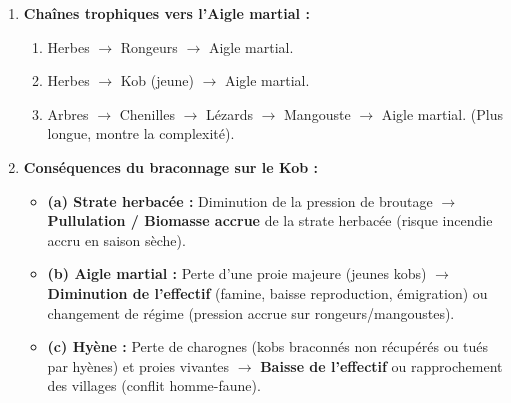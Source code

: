 \documentclass[11pt]{article}
\begin{document}
\begin{exoresolu}
\begin{enumerate}
\begin{center}
\begin{tabularx}{\linewidth}{|l|X|X|X|X|X|}
        \rowcolor{popgreenL} \textbf{Producteurs} & \textbf{Cons. 1\up{er} (Herbivores)} & \textbf{Cons. 2\up{nd} (Carniv. 1\up{er})} & \textbf{Cons. 3\up{me} (Carniv. 2\up{nd})} & \textbf{Cons. 4\up{me} (Superpréd.)} & \textbf{Décomposeurs} \\ \hline
        Herbes, Arbres, Arbustes & Sauterelles, Chenilles, Rongeurs, Kob, Phacochère & Lézards, Mangouste & Python, Aigle martial, Hyène, Chacal & (Aigle martial, Hyène -- sommet) & Bactéries, Champignons, Termites \\ \hline
        \end{tabularx}
        \end{center}
        \textit{Note :} L'Aigle martial et la Hyène peuvent occuper le niveau 3 ou 4 selon la proie (ex: manger un python = niveau 4). On les place au plus haut niveau atteint.
        \item \textbf{Chaînes trophiques vers l'Aigle martial :}
              \begin{enumerate}
                  \item Herbes $\rightarrow$ Rongeurs $\rightarrow$ Aigle martial.
                  \item Herbes $\rightarrow$ Kob (jeune) $\rightarrow$ Aigle martial.
                  \item Arbres $\rightarrow$ Chenilles $\rightarrow$ Lézards $\rightarrow$ Mangouste $\rightarrow$ Aigle martial. (Plus longue, montre la complexité).
              \end{enumerate}
        \item \textbf{Conséquences du braconnage sur le Kob :}
              \begin{itemize}
                  \item \textbf{(a) Strate herbacée :} Diminution de la pression de broutage $\rightarrow$ \textbf{Pullulation / Biomasse accrue} de la strate herbacée (risque incendie accru en saison sèche).
                  \item \textbf{(b) Aigle martial :} Perte d'une proie majeure (jeunes kobs) $\rightarrow$ \textbf{Diminution de l'effectif} (famine, baisse reproduction, émigration) ou changement de régime (pression accrue sur rongeurs/mangoustes).
                  \item \textbf{(c) Hyène :} Perte de charognes (kobs braconnés non récupérés ou tués par hyènes) et proies vivantes $\rightarrow$ \textbf{Baisse de l'effectif} ou rapprochement des villages (conflit homme-faune).
              \end{itemize}

\end{enumerate}
\end{exoresolu}
\end{document}
